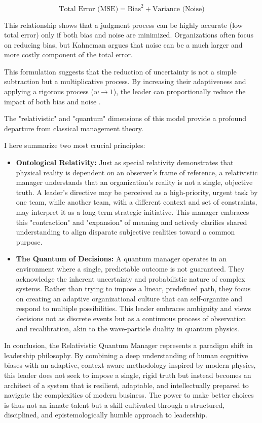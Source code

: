 \documentclass{article}
\begin{document}
 $$ \text{Total Error (MSE)} = \text{Bias}^2 + \text{Variance (Noise)} $$
 
 This relationship shows that a judgment process can be highly accurate (low total error) only if both bias and noise are minimized. Organizations often focus on reducing bias, but Kahneman argues that noise can be a much larger and more costly component of the total error.

 
This formulation suggests that the reduction of uncertainty is not a simple subtraction but a multiplicative process. By increasing their adaptiveness and applying a rigorous process ($w \to 1$), the leader can proportionally reduce the impact of both bias and noise \cite{kahneman1979prospect}.


The "relativistic" and "quantum" dimensions of this model provide a profound departure from classical management theory.

I here summarize two most crucial principles:
\begin{itemize}
    \item \textbf{Ontological Relativity:} Just as special relativity demonstrates that physical reality is dependent on an observer’s frame of reference, a relativistic manager understands that an organization's reality is not a single, objective truth. A leader’s directive may be perceived as a high-priority, urgent task by one team, while another team, with a different context and set of constraints, may interpret it as a long-term strategic initiative. This manager embraces this "contraction" and "expansion" of meaning and actively clarifies shared understanding to align disparate subjective realities toward a common purpose.
    \item \textbf{The Quantum of Decisions:} A quantum manager operates in an environment where a single, predictable outcome is not guaranteed. They acknowledge the inherent uncertainty and probabilistic nature of complex systems. Rather than trying to impose a linear, predefined path, they focus on creating an adaptive organizational culture that can self-organize and respond to multiple possibilities. This leader embraces ambiguity and views decisions not as discrete events but as a continuous process of observation and recalibration, akin to the wave-particle duality in quantum physics.
\end{itemize}

In conclusion, the Relativistic Quantum Manager represents a paradigm shift in leadership philosophy. By combining a deep understanding of human cognitive biases with an adaptive, context-aware methodology inspired by modern physics, this leader does not seek to impose a single, rigid truth but instead becomes an architect of a system that is resilient, adaptable, and intellectually prepared to navigate the complexities of modern business. The power to make better choices is thus not an innate talent but a skill cultivated through a structured, disciplined, and epistemologically humble approach to leadership.
\end{document}
